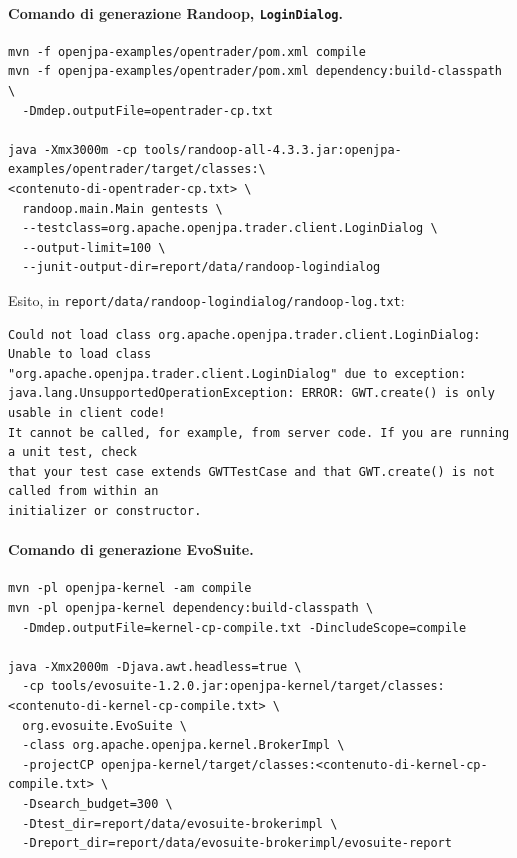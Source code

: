\paragraph*{Comando di generazione Randoop, \texttt{LoginDialog}.}
\label{cmd:randoop-logindialog}
\begin{lstlisting}
mvn -f openjpa-examples/opentrader/pom.xml compile
mvn -f openjpa-examples/opentrader/pom.xml dependency:build-classpath \
  -Dmdep.outputFile=opentrader-cp.txt

java -Xmx3000m -cp tools/randoop-all-4.3.3.jar:openjpa-examples/opentrader/target/classes:\
<contenuto-di-opentrader-cp.txt> \
  randoop.main.Main gentests \
  --testclass=org.apache.openjpa.trader.client.LoginDialog \
  --output-limit=100 \
  --junit-output-dir=report/data/randoop-logindialog
\end{lstlisting}
Esito, in \texttt{report/data/randoop-logindialog/randoop-log.txt}:
\begin{lstlisting}
Could not load class org.apache.openjpa.trader.client.LoginDialog: Unable to load class
"org.apache.openjpa.trader.client.LoginDialog" due to exception:
java.lang.UnsupportedOperationException: ERROR: GWT.create() is only usable in client code!
It cannot be called, for example, from server code. If you are running a unit test, check
that your test case extends GWTTestCase and that GWT.create() is not called from within an
initializer or constructor.
\end{lstlisting}

\paragraph*{Comando di generazione EvoSuite.}
\label{cmd:evosuite-brokerimpl-gen}
\begin{lstlisting}
mvn -pl openjpa-kernel -am compile
mvn -pl openjpa-kernel dependency:build-classpath \
  -Dmdep.outputFile=kernel-cp-compile.txt -DincludeScope=compile

java -Xmx2000m -Djava.awt.headless=true \
  -cp tools/evosuite-1.2.0.jar:openjpa-kernel/target/classes:<contenuto-di-kernel-cp-compile.txt> \
  org.evosuite.EvoSuite \
  -class org.apache.openjpa.kernel.BrokerImpl \
  -projectCP openjpa-kernel/target/classes:<contenuto-di-kernel-cp-compile.txt> \
  -Dsearch_budget=300 \
  -Dtest_dir=report/data/evosuite-brokerimpl \
  -Dreport_dir=report/data/evosuite-brokerimpl/evosuite-report
\end{lstlisting}

